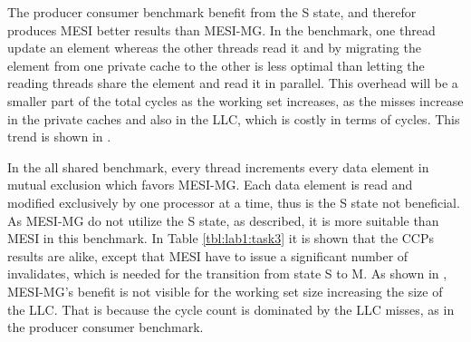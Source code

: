 The producer consumer benchmark benefit from the S state, and therefor produces MESI better results than MESI-MG. In the benchmark, one thread update an element whereas the other threads read it and by migrating the element from one private cache to the other is less optimal than letting the reading threads share the element and read it in parallel. This overhead will be a smaller part of the total cycles as the working set increases, as the misses increase in the private caches and also in the LLC, which is costly in terms of cycles. This trend is shown in . 

In the all shared benchmark, every thread increments every data element in mutual exclusion which favors MESI-MG. Each data element is read and modified exclusively by one processor at a time, thus is the S state not beneficial. As MESI-MG do not utilize the S state, as described, it is more suitable than MESI in this benchmark. In Table \ref{tbl:lab1:task3} it is shown that the CCPs results are alike, except that MESI have to issue a significant number of invalidates, which is needed for the transition from state S to M. As shown in , MESI-MG's benefit is not visible for the working set size increasing the size of the LLC. That is because the cycle count is dominated by the LLC misses, as in the producer consumer benchmark.